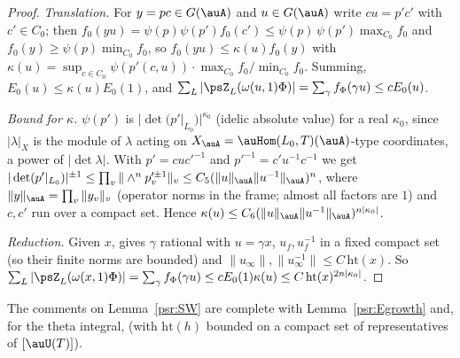 \documentclass[10pt]{amsart}
\theoremstyle{definition}
\theoremstyle{remark}
\begin{document}
\begin{proof}
\emph{Translation.} For
$y=pc\in G(\auA)$ and $u\in G(\auA)$ write $cu=p'c'$ with $c'\in C_0$; then $f_0(yu)=\psi(p)\psi(p')f_0(c')
\le\psi(p)\,\psi(p')\max_{C_0}f_0$ and $f_0(y)\ge\psi(p)\min_{C_0}f_0$, so
$f_0(yu)\le\kappa(u)f_0(y)$ with $\kappa(u)=\sup_{c\in C_0}\psi(p'(c,u))\cdot\max_{C_0}f_0/\min_{C_0}f_0$. Summing,
$E_0(u)\le\kappa(u)E_0(1)$, and $\sum_L|\psZ_L(\omega(u,1)\Phi)|=\sum_\gamma f_\Phi(\gamma u)\le cE_0(u)$.

\emph{Bound for $\kappa$.} $\psi(p')$ is $|\det(p'|_{L_0})|^{\kappa_0}$ (idelic absolute value) for a real
$\kappa_0$, since $|\lambda|_X$ is the module of $\lambda$ acting on $X_\auA=\auHom(L_0,T)(\auA)$-type
coordinates, a power of $|\det\lambda|$. With $p'=cuc'^{-1}$ and $p'^{-1}=c'u^{-1}c^{-1}$ we get
$|\det(p'|_{L_0})|^{\pm1}\le\prod_v\|\wedge^n p'^{\pm1}_v\|_v\le C_5(\|u\|_\auA\|u^{-1}\|_\auA)^n$, where
$\|y\|_\auA=\prod_v\|y_v\|_v$ (operator norms in the frame; almost all factors are $1$) and $c,c'$ run over a
compact set. Hence $\kappa(u)\le C_6(\|u\|_\auA\|u^{-1}\|_\auA)^{n|\kappa_0|}$.

\emph{Reduction.} Given $x$, {\cite[Lemma~3.28]{P53}} gives $\gamma$ rational with $u=\gamma x$, $u_f,u_f^{-1}$ in a
fixed compact set (so their finite norms are bounded) and $\|u_\infty\|,\|u_\infty^{-1}\|\le C\,\mathrm{ht}(x)$.
So $\sum_L|\psZ_L(\omega(x,1)\Phi)|=\sum_\gamma f_\Phi(\gamma u)\le cE_0(1)\kappa(u)\le C\,\mathrm{ht}(x)^{2n|\kappa_0|}$.
\end{proof}

\noindent The comments on Lemma~\ref{psr:SW} are complete with Lemma~\ref{psr:Egrowth} and, for the theta
integral, {\cite[Lemma~3.29]{P53}} (with $\mathrm{ht}(h)$ bounded on a compact set of representatives of
$[\auU(T)]$).
\end{document}
